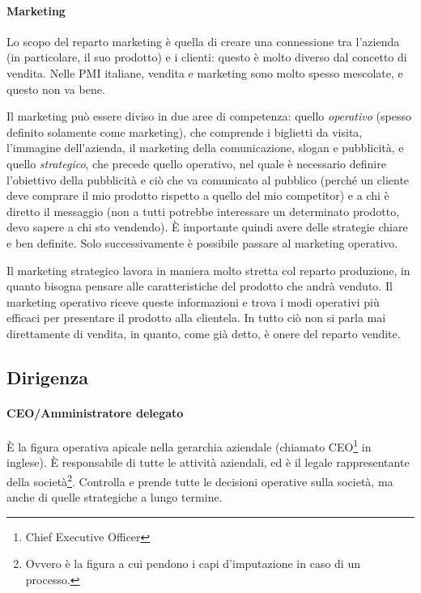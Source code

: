 \paragraph*{Marketing} Lo scopo del reparto marketing è quella di creare una
connessione tra l'azienda (in particolare, il suo prodotto) e i clienti: questo
è molto diverso dal concetto di vendita. Nelle PMI italiane, 
vendita e marketing sono molto spesso mescolate, e questo non va bene.

Il marketing può essere diviso in due aree di competenza: quello
\textit{operativo} (spesso definito solamente come marketing), che comprende i
biglietti da visita, l'immagine dell'azienda, il marketing della comunicazione,
slogan e pubblicità, e quello \textit{strategico}, che precede quello
operativo, nel quale è necessario definire l'obiettivo della pubblicità e ciò
che va comunicato al pubblico (perché un cliente deve comprare il mio prodotto
rispetto a quello del mio competitor) e a chi è diretto il messaggio (non a
tutti potrebbe interessare un determinato prodotto, devo sapere a chi sto
vendendo). È importante quindi avere delle strategie chiare e ben definite.
Solo successivamente è possibile passare al marketing operativo.

Il marketing strategico lavora in maniera molto stretta col reparto produzione,
in quanto bisogna pensare alle caratteristiche del prodotto che andrà venduto.
Il marketing operativo riceve queste informazioni e trova i modi operativi più
efficaci per presentare il prodotto alla clientela. In tutto ciò non si parla
mai direttamente di vendita, in quanto, come già detto, è onere del reparto
vendite.

\subsection{Dirigenza}

\paragraph*{CEO/Amministratore delegato} È la figura operativa apicale nella
gerarchia aziendale (chiamato CEO\footnote{Chief Executive Officer} in
inglese). È responsabile di tutte le attività aziendali, ed è il legale
rappresentante della società\footnote{Ovvero è la figura a cui pendono i capi
d'imputazione in caso di un processo.}. Controlla e prende tutte le decisioni
operative sulla società, ma anche di quelle strategiche a lungo termine.

